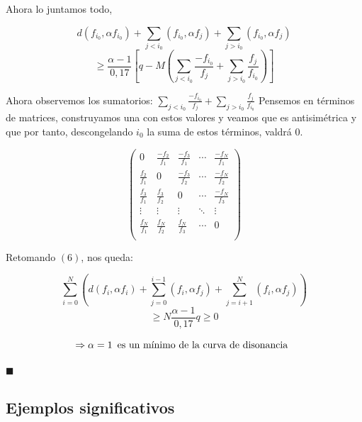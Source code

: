 \documentclass[11pt,a4paper]{article}
\begin{document}
	
	Ahora lo juntamos todo, 
	
	\begin{equation*}
	     d(f_{i_0}, \alpha f_{i_0})  +  \sum_{j < i_0} (f_{i_0}, \alpha f_j)  +  \sum_{j > i_0} (f_{i_0}, \alpha f_j)
	\end{equation*}
	\begin{equation}
	    \geq \frac{\alpha - 1}{0,17}  \left[ q - M \left(  \sum_{j<i_0} \frac{-f_{i_0}}{f_j} + \sum_{j>i_0} \frac{f_j}{f_{i_0}} \right) \right]
	\end{equation}
	
	
	Ahora observemos los sumatorios: $ \sum_{j<i_0} \frac{-f_{i_0}}{f_j} + \sum_{j>i_0} \frac{f_j}{f_{i_0}} $
	Pensemos en términos de matrices, construyamos una con estos valores y veamos que es antisimétrica y que por tanto, descongelando $i_0$ la suma de estos términos, valdrá $0$.	
	
    \[
        \begin{pmatrix} 
            0 & \frac{-f_2}{f_1} & \frac{-f_3}{f_1} & \cdots & \frac{-f_N}{f_1} \\
	        \frac{f_2}{f_1} & 0 & \frac{-f_3}{f_2} & \cdots & \frac{-f_N}{f_2} \\
	        \frac{f_3}{f_1} & \frac{f_3}{f_2} & 0  & \cdots &  \frac{-f_N}{f_3} \\
            \vdots & \vdots & \vdots & \ddots & \vdots \\
            \frac{f_N}{f_1} & \frac{f_N}{f_2} & \frac{f_N}{f_3} & \cdots & 0 \\  
        \end{pmatrix}
    \]
	
	Retomando $(6)$, nos queda:
	
	\begin{equation*}
	    \sum_{i = 0}^{N} \left( d(f_{i}, \alpha f_{i})  +  \sum_{j=0}^{i-1} (f_{i}, \alpha f_j)  +  \sum_{j=i+1}^{N} (f_{i}, \alpha f_j) \right)
	\end{equation*}
	\begin{equation}
	    \geq N \frac{\alpha-1}{0,17} q \geq 0
	\end{equation}
	
	$$
	\Rightarrow \alpha = 1 \textnormal{\, es un mínimo de la curva de disonancia \,}
	$$
	
	$\blacksquare$
	
	
	
	\newpage
	\subsection{Ejemplos significativos}
	
\end{document}
